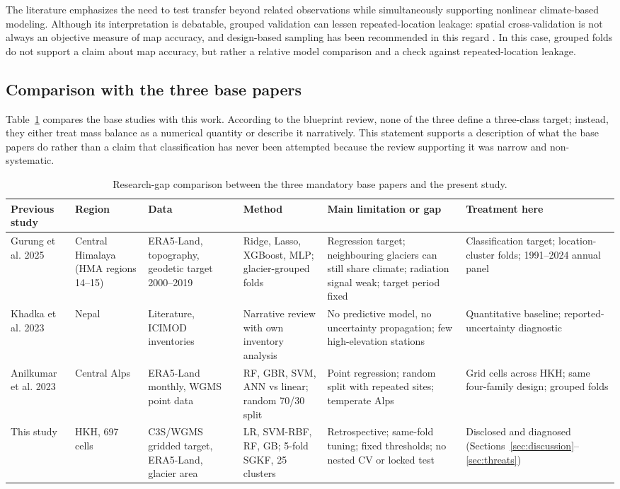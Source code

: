 \documentclass[conference]{IEEEtran}
\begin{document}
The literature emphasizes the need to test transfer beyond related observations while simultaneously supporting nonlinear climate-based modeling. Although its interpretation is debatable, grouped validation can lessen repeated-location leakage: spatial cross-validation is not always an objective measure of map accuracy, and design-based sampling has been recommended in this regard \cite{roberts2017,meyer2021,wadoux2021}. In this case, grouped folds do not support a claim about map accuracy, but rather a relative model comparison and a check against repeated-location leakage.

\subsection{Comparison with the three base papers}
Table~\ref{tab:gap} compares the base studies with this work. According to the blueprint review, none of the three define a three-class target; instead, they either treat mass balance as a numerical quantity or describe it narratively. This statement supports a description of what the base papers do rather than a claim that classification has never been attempted because the review supporting it was narrow and non-systematic.

\begin{table}[t]
\caption{Research-gap comparison between the three mandatory base papers and the present study.}
\label{tab:gap}
\centering
\footnotesize
\setlength{\tabcolsep}{3pt}
\begin{tabular}{p{}p{}p{}p{}p{}p{}}
\toprule
Previous study & Region & Data & Method & Main limitation or gap & Treatment here\\
\midrule
Gurung et al. 2025 \cite{gurung2025} & Central Himalaya (HMA regions 14--15) & ERA5-Land, topography, geodetic target 2000--2019 & Ridge, Lasso, XGBoost, MLP; glacier-grouped folds & Regression target; neighbouring glaciers can still share climate; radiation signal weak; target period fixed & Classification target; location-cluster folds; 1991--2024 annual panel\\
Khadka et al. 2023 \cite{khadka2023} & Nepal & Literature, ICIMOD inventories & Narrative review with own inventory analysis & No predictive model, no uncertainty propagation; few high-elevation stations & Quantitative baseline; reported-uncertainty diagnostic\\
Anilkumar et al. 2023 \cite{anilkumar2023} & Central Alps & ERA5-Land monthly, WGMS point data & RF, GBR, SVM, ANN vs linear; random 70/30 split & Point regression; random split with repeated sites; temperate Alps & Grid cells across HKH; same four-family design; grouped folds\\
This study & HKH, 697 cells & C3S/WGMS gridded target, ERA5-Land, glacier area & LR, SVM-RBF, RF, GB; 5-fold SGKF, 25 clusters & Retrospective; same-fold tuning; fixed thresholds; no nested CV or locked test & Disclosed and diagnosed (Sections~\ref{sec:discussion}--\ref{sec:threats})\\
\bottomrule
\end{tabular}
\end{table}
\end{document}
